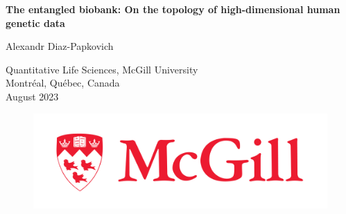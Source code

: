 \begin{titlepage}
\begin{center}







{\sf\bfseries\LARGE  The entangled biobank: On the topology of high-dimensional human genetic data }






\vspace{1.5cm}

{\large Alexandr Diaz-Papkovich}

\vspace{1.5cm}



Quantitative Life Sciences, McGill University\\
Montr\'{e}al, Qu\'{e}bec, Canada\\
August 2023

\vspace{1.5cm}





\begin{figure}[H]
\centering
\includegraphics[width=0.4\columnwidth]{mcgill_sig_red.jpg}
\end{figure}


\end{center}
\end{titlepage}
